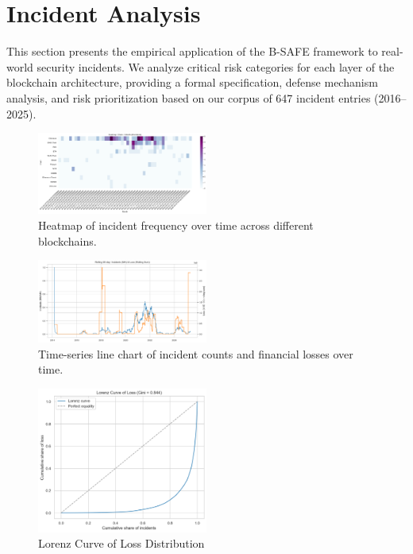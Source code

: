 \section{Incident Analysis}
\label{sec:incident_analysis}

This section presents the empirical application of the B-SAFE framework to real-world security incidents. We analyze critical risk categories for each layer of the blockchain architecture, providing a formal specification, defense mechanism analysis, and risk prioritization based on our corpus of 647 incident entries (2016--2025).

\begin{figure}[H]
\centering
\includegraphics[width=0.5\textwidth]{../figure/Figure/figures_2/J11_heatmap_chain_month_incidents.png}
\caption{Heatmap of incident frequency over time across different blockchains.}
\label{fig:incident_timeline}
\end{figure}

\begin{figure}[H]
\centering
\includegraphics[width=0.5\textwidth]{../figure/Figure/figures_2/J12_rolling90_incidents_loss.png}
\caption{Time-series line chart of incident counts and financial losses over time.}
\label{fig:cross_layer_dependencies}
\end{figure}







\begin{figure}[H]
\centering
\includegraphics[width=0.5\textwidth]{../figure/Figure/figures_2/J13_lorenz_gini_loss.png}
\caption{Lorenz Curve of Loss Distribution}
\label{fig:risk_scores_summary}
\end{figure}
